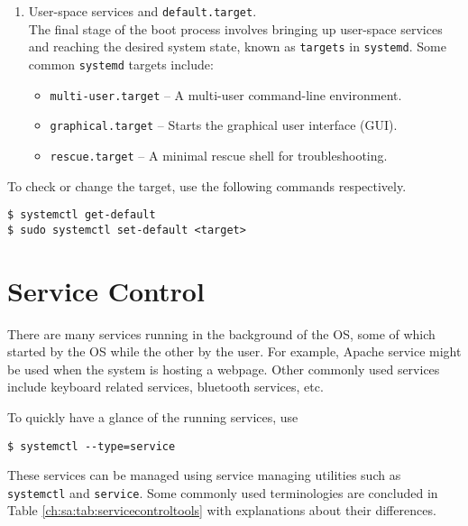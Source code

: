 \begin{enumerate}
  \item User-space services and \texttt{default.target}. \\
  The final stage of the boot process involves bringing up user-space services and reaching the desired system state, known as \verb|targets| in \verb|systemd|. Some common \texttt{systemd} targets include:
  \begin{itemize}
      \item \texttt{multi-user.target} – A multi-user command-line environment.
      \item \texttt{graphical.target} – Starts the graphical user interface (GUI).
      \item \texttt{rescue.target} – A minimal rescue shell for troubleshooting.
  \end{itemize}
\end{enumerate}

To check or change the target, use the following commands respectively.
\begin{lstlisting}
$ systemctl get-default
$ sudo systemctl set-default <target>
\end{lstlisting}

\section{Service Control} \label{ch:sa:sec:sc}

There are many services running in the background of the OS, some of which started by the OS while the other by the user. For example, Apache service might be used when the system is hosting a webpage. Other commonly used services include keyboard related services, bluetooth services, etc.

To quickly have a glance of the running services, use
\begin{lstlisting}
$ systemctl --type=service
\end{lstlisting}

These services can be managed using service managing utilities such as \verb|systemctl| and \verb|service|. Some commonly used terminologies are concluded in Table \ref{ch:sa:tab:servicecontroltools} with explanations about their differences.

